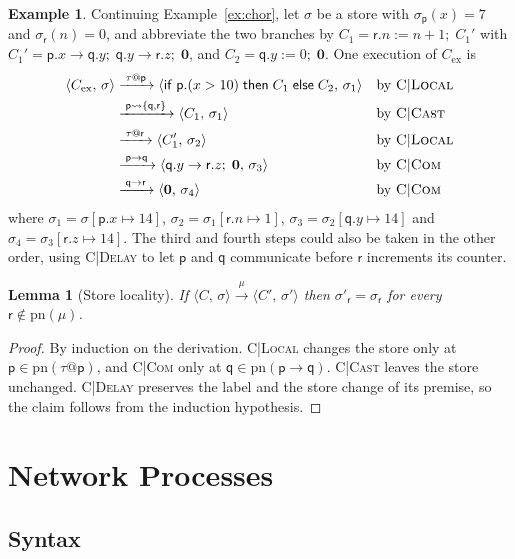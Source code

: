 \documentclass[11pt]{article}
\makeatletter
\theoremstyle{plain}
\newtheorem{lemma}[theorem]{Lemma}
\theoremstyle{definition}
\newtheorem{example}[theorem]{Example}
\theoremstyle{remark}
\newcommand{\kw}[1]{\mathsf{#1}}
\newcommand{\kif}{\kw{if}\;}
\newcommand{\kthen}{\;\kw{then}\;}
\newcommand{\kelse}{\;\kw{else}\;}
\newcommand{\nil}{\mathbf{0}}
\newcommand{\seq}{;\;}
\newcommand{\pp}{\mathsf{p}}
\newcommand{\qq}{\mathsf{q}}
\newcommand{\rr}{\mathsf{r}}
\newcommand{\pn}{\mathrm{pn}}
\newcommand{\conf}[2]{\langle #1,\, #2\rangle}
\newcommand{\lto}[1]{\xrightarrow{\;#1\;}}
\newcommand{\tauat}[1]{\tau\mathord{@}#1}
\newcommand{\cast}[2]{#1 \rightsquigarrow #2}
\newcommand{\upd}[3]{#1[#2 \mapsto #3]}
\newcommand{\rn}[1]{{\normalfont\scshape #1}}
\newcommand{\ifcond}[3]{\kif #1 \kthen #2 \kelse #3}
\makeatother
\begin{document}
\begin{example}\label{ex:run}
  Continuing Example~\ref{ex:chor}, let $\sigma$ be a store with
  $\sigma_\pp(x) = 7$ and $\sigma_\rr(n) = 0$, and abbreviate the two branches
  by $C_1 = \rr.n := n+1 \seq C_1'$ with
  $C_1' = \pp.x \to \qq.y \seq \qq.y \to \rr.z \seq \nil$, and
  $C_2 = \qq.y := 0 \seq \nil$.  One execution of $C_{\mathrm{ex}}$ is
  \begin{align*}
    \conf{C_{\mathrm{ex}}}{\sigma}
      &\lto{\tauat{\pp}} \conf{\ifcond{\pp.(x>10)}{C_1}{C_2}}{\sigma_1}
      && \text{by \rn{C|Local}}\\
      &\lto{\cast{\pp}{\{\qq,\rr\}}} \conf{C_1}{\sigma_1}
      && \text{by \rn{C|Cast}}\\
      &\lto{\tauat{\rr}} \conf{C_1'}{\sigma_2}
      && \text{by \rn{C|Local}}\\
      &\lto{\pp\to\qq} \conf{\qq.y \to \rr.z \seq \nil}{\sigma_3}
      && \text{by \rn{C|Com}}\\
      &\lto{\qq\to\rr} \conf{\nil}{\sigma_4}
      && \text{by \rn{C|Com}}
  \end{align*}
  where $\sigma_1 = \upd{\sigma}{\pp.x}{14}$, $\sigma_2 = \upd{\sigma_1}{\rr.n}{1}$,
  $\sigma_3 = \upd{\sigma_2}{\qq.y}{14}$ and $\sigma_4 = \upd{\sigma_3}{\rr.z}{14}$.
  The third and fourth steps could also be taken in the other order, using
  \rn{C|Delay} to let $\pp$ and $\qq$ communicate before $\rr$ increments its
  counter.
\end{example}

\begin{lemma}[Store locality]\label{lem:chor-locality}
  If $\conf{C}{\sigma} \lto{\mu} \conf{C'}{\sigma'}$ then
  $\sigma'_\rr = \sigma_\rr$ for every $\rr \notin \pn(\mu)$.
\end{lemma}
\begin{proof}
  By induction on the derivation.  \rn{C|Local} changes the store only at
  $\pp \in \pn(\tauat\pp)$, and \rn{C|Com} only at $\qq \in \pn(\pp\to\qq)$.
  \rn{C|Cast} leaves the store unchanged.  \rn{C|Delay} preserves the label
  and the store change of its premise, so the claim follows from the
  induction hypothesis.
\end{proof}

\section{Network Processes}
\label{sec:net}

\subsection{Syntax}
\end{document}
